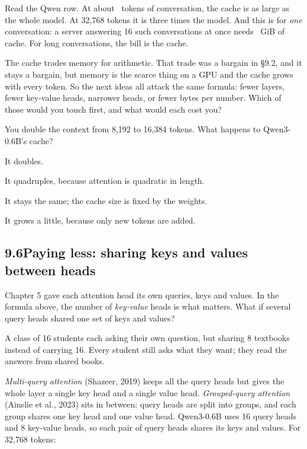 Read the Qwen row. At about \nNineQwenCross\ tokens of conversation, the cache is as large as the whole
model. At 32{,}768 tokens it is three times the model. And this is for \emph{one} conversation: a server
answering 16 such conversations at once needs \nNineQwenBatchSixteen\ GiB of cache. For long conversations,
the bill is the cache.

\Why The cache trades memory for arithmetic. That trade was a bargain in \S9.2, and it stays a bargain, but
memory is the scarce thing on a GPU and the cache grows with every token. So the next ideas all attack the
same formula: fewer layers, fewer key-value heads, narrower heads, or fewer bytes per number. Which of those
would you touch first, and what would each cost you?

\begin{checkq}
You double the context from 8{,}192 to 16{,}384 tokens. What happens to Qwen3-0.6B's cache?
\begin{options}
\item It doubles.
\item It quadruples, because attention is quadratic in length.
\item It stays the same; the cache size is fixed by the weights.
\item It grows a little, because only new tokens are added.
\end{options}
\end{checkq}


\subsection*{9.6\quad Paying less: sharing keys and values between heads}

Chapter 5 gave each attention head its own queries, keys and values. In the formula above, the number of
\emph{key-value} heads is what matters. What if several query heads shared one set of keys and values?

\Picture A class of 16 students each asking their own question, but sharing 8 textbooks instead of
carrying 16. Every student still asks what they want; they read the answers from shared books.

\Exactly \emph{Multi-query attention} (Shazeer, 2019) keeps all the query heads but gives the whole layer a
single key head and a single value head. \emph{Grouped-query attention} (Ainslie et al., 2023) sits in
between: query heads are split into groups, and each group shares one key head and one value head.
Qwen3-0.6B uses 16 query heads and 8 key-value heads, so each pair of query heads shares its keys and values.
For 32{,}768 tokens:

